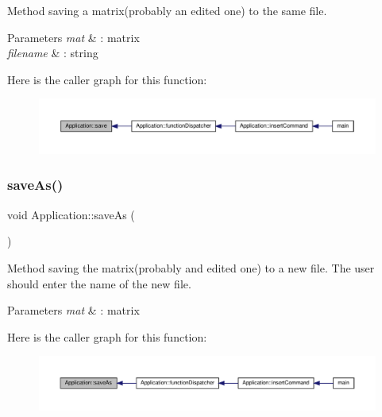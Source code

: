 Method saving a matrix(probably an edited one) to the same file. 
\begin{DoxyParams}{Parameters}
{\em mat} & \+: matrix \\
\hline
{\em filename} & \+: string \\
\hline
\end{DoxyParams}
Here is the caller graph for this function\+:
\nopagebreak
\begin{figure}[H]
\begin{center}
\leavevmode
\includegraphics[width=350pt]{class_application_a2cbf94e01d55a814de35f90f4d874647_icgraph}
\end{center}
\end{figure}
\mbox{\label{class_application_a10d5a48c95593cee25c1b9e0e257b5a7}} 
\subsubsection{\texorpdfstring{save\+As()}{saveAs()}}
{\footnotesize\ttfamily void Application\+::save\+As (\begin{DoxyParamCaption}{ }\end{DoxyParamCaption})\hspace{0.3cm}{\ttfamily [private]}}

Method saving the matrix(probably and edited one) to a new file. The user should enter the name of the new file. 
\begin{DoxyParams}{Parameters}
{\em mat} & \+: matrix \\
\hline
\end{DoxyParams}
Here is the caller graph for this function\+:
\nopagebreak
\begin{figure}[H]
\begin{center}
\leavevmode
\includegraphics[width=350pt]{class_application_a10d5a48c95593cee25c1b9e0e257b5a7_icgraph}
\end{center}
\end{figure}
\mbox{\label{class_application_ae652f7ff140c5a74c3806f728e9a18f3}} 
